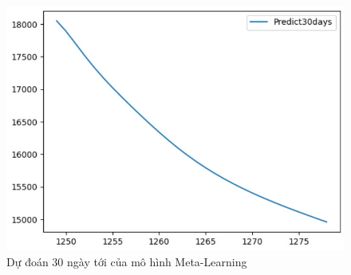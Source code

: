 \begin{figure}[H]
\begin{minipage}{0.15\textwidth}
    \includegraphics[width=1\textwidth]{resources/chapter-5/predicted/EXB_LSTM_9_1_next30days.jpg}
    \end{minipage}
    \hfill
    
    \caption{Dự đoán 30 ngày tới của mô hình Meta-Learning}
    \label{fig:lstm_predicted}
\end{figure}


